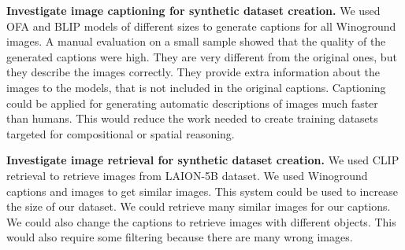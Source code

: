 \textbf{Investigate image captioning for synthetic dataset creation.} We used OFA \cite{wang2022unifying} and BLIP \cite{li2022blip} models of different sizes to generate captions for all Winoground images. A manual evaluation on a small sample showed that the quality of the generated captions were high. They are very different from the original ones, but they describe the images correctly. They provide extra information about the images to the models, that is not included in the original captions. Captioning could be applied for generating automatic descriptions of images much faster than humans. This would reduce the work needed to create training datasets targeted for compositional or spatial reasoning.

\textbf{Investigate image retrieval for synthetic dataset creation.} We used CLIP retrieval to retrieve images from LAION-5B \cite{schuhmann2022laionb} dataset. We used Winoground captions and images to get similar images. This system could be used to increase the size of our dataset. We could retrieve many similar images for our captions. We could also change the captions to retrieve images with different objects. This would also require some filtering because there are many wrong images.